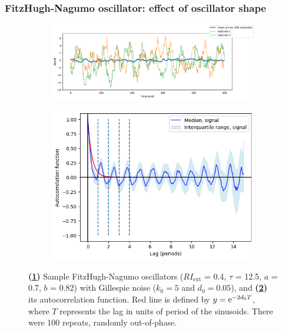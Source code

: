 \subsubsection{FitzHugh-Nagumo oscillator: effect of oscillator shape}
\label{subsubsec:analysis-characterisation-acf-fhn}

\begin{figure}
  \centering
  \begin{subfigure}[t]{0.6\textwidth}
  \centering
    \includegraphics[width=\linewidth]{fhn_meanplot}
    \caption{
    }
    \label{fig:acf-fhn-gillnoise-ts}
  \end{subfigure}%
  \begin{subfigure}[t]{0.4\textwidth}
  \centering
    \includegraphics[width=\linewidth]{fhn_acf}
    \caption{
    }
    \label{fig:acf-fhn-gillnoise-acf}
  \end{subfigure}

  \caption{
    \textbf{(\ref{fig:acf-fhn-gillnoise-ts})} Sample FitzHugh-Nagumo oscillators ($RI_{\mathrm{ext}}$ = 0.4, $\tau$ = 12.5, $a$ = 0.7, $b$ = 0.82) with Gillespie noise ($k_{0} = 5$ and $d_{0} = 0.05$), and 
    \textbf{(\ref{fig:acf-fhn-gillnoise-acf})} its autocorrelation function.
    Red line is defined by $y = \mathrm{e}^{-2d_{0}T}$, where $T$ represents the lag in units of period of the sinusoids.
    There were 100 repeats, randomly out-of-phase.
  }
  \label{fig:acf-fhn}
\end{figure}


